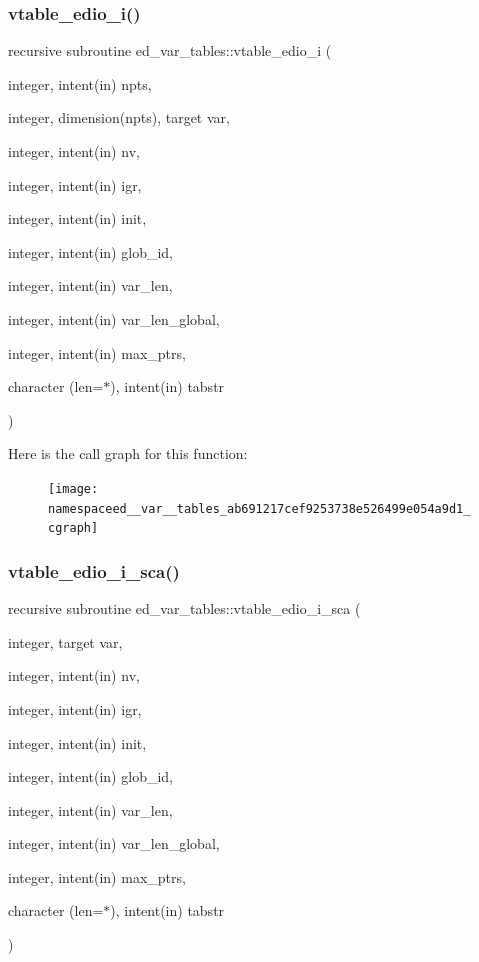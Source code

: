 \subsubsection{\texorpdfstring{vtable\+\_\+edio\+\_\+i()}{vtable\_edio\_i()}}
{\footnotesize\ttfamily recursive subroutine ed\+\_\+var\+\_\+tables\+::vtable\+\_\+edio\+\_\+i (\begin{DoxyParamCaption}\item[{integer, intent(in)}]{npts,  }\item[{integer, dimension(npts), target}]{var,  }\item[{integer, intent(in)}]{nv,  }\item[{integer, intent(in)}]{igr,  }\item[{integer, intent(in)}]{init,  }\item[{integer, intent(in)}]{glob\+\_\+id,  }\item[{integer, intent(in)}]{var\+\_\+len,  }\item[{integer, intent(in)}]{var\+\_\+len\+\_\+global,  }\item[{integer, intent(in)}]{max\+\_\+ptrs,  }\item[{character (len=$\ast$), intent(in)}]{tabstr }\end{DoxyParamCaption})}

Here is the call graph for this function\+:
\nopagebreak
\begin{figure}[H]
\begin{center}
\leavevmode
\texttt{[image: namespaceed\_\_var\_\_tables\_ab691217cef9253738e526499e054a9d1\_cgraph]}
\end{center}
\end{figure}
\mbox{\label{namespaceed__var__tables_a4a36c3fac62213e4eba4ffa37efbc3cc}} 
\subsubsection{\texorpdfstring{vtable\+\_\+edio\+\_\+i\+\_\+sca()}{vtable\_edio\_i\_sca()}}
{\footnotesize\ttfamily recursive subroutine ed\+\_\+var\+\_\+tables\+::vtable\+\_\+edio\+\_\+i\+\_\+sca (\begin{DoxyParamCaption}\item[{integer, target}]{var,  }\item[{integer, intent(in)}]{nv,  }\item[{integer, intent(in)}]{igr,  }\item[{integer, intent(in)}]{init,  }\item[{integer, intent(in)}]{glob\+\_\+id,  }\item[{integer, intent(in)}]{var\+\_\+len,  }\item[{integer, intent(in)}]{var\+\_\+len\+\_\+global,  }\item[{integer, intent(in)}]{max\+\_\+ptrs,  }\item[{character (len=$\ast$), intent(in)}]{tabstr }\end{DoxyParamCaption})}

